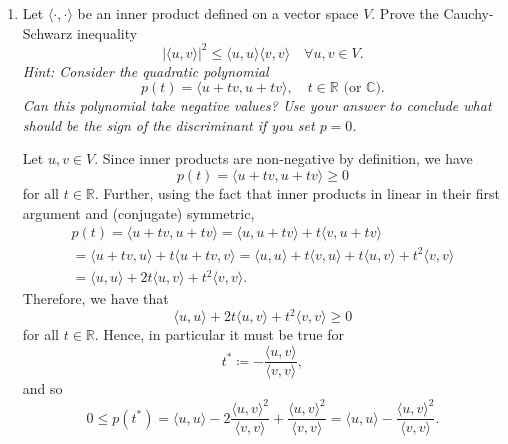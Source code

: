 \documentclass{../kin_math}
\begin{document}
\begin{questions}
  \question
  \begin{enumerate}
    \item Let $\langle \cdot, \cdot \rangle$ be an inner product defined on a vector space $V$. Prove the Cauchy-Schwarz inequality
    \begin{equation}
      |\langle u, v \rangle|^2 \leq \langle u, u \rangle \langle v, v \rangle \quad \forall u, v \in V.
    \end{equation}
    \emph{Hint: Consider the quadratic polynomial}
    \begin{equation}
      p(t) = \langle u + tv, u + tv \rangle, \quad t \in \mathbb{R} \text{ (or $\mathbb{C}$)}.
    \end{equation}
    \emph{Can this polynomial take negative values? Use your answer to conclude what should be the sign of the discriminant if you set $p = 0$.}
    \begin{solution}
      Let $u, v \in V$. Since inner products are non-negative by definition, we have
      \begin{equation*}
        p(t) = \langle u + tv, u + tv \rangle \geq 0
      \end{equation*}
      for all $t \in \mathbb{R}$. Further, using the fact that inner products in linear in their first argument and (conjugate) symmetric,
      \begin{multline*}
        p(t) = \langle u + tv, u + tv \rangle = \langle u, u + tv \rangle + t \langle v, u + tv \rangle \\
        = \langle u + tv, u \rangle + t \langle u + tv, v \rangle = \langle u, u \rangle + t \langle v, u \rangle + t \langle u, v \rangle + t^2 \langle v, v \rangle \\
        = \langle u, u \rangle + 2t \langle u, v \rangle + t^2 \langle v, v \rangle.
      \end{multline*}
      Therefore, we have that
      \begin{equation*}
        \langle u, u \rangle + 2t \langle u, v \rangle + t^2 \langle v, v \rangle \geq 0
      \end{equation*}
      for all $t \in \mathbb{R}$. Hence, in particular it must be true for
      \begin{equation*}
        t^* \coloneqq -\frac{\langle u, v \rangle}{\langle v, v \rangle},
      \end{equation*}
      and so
      \begin{equation*}
        0 \leq p(t^*) = \langle u, u \rangle - 2 \frac{\langle u, v \rangle^2}{\langle v, v \rangle} + \frac{\langle u, v \rangle^2}{\langle v, v \rangle} = \langle u, u \rangle - \frac{\langle u, v \rangle^2}{\langle v, v \rangle}.

\end{equation*}
\end{solution}
\end{enumerate}
\end{questions}
\end{document}
